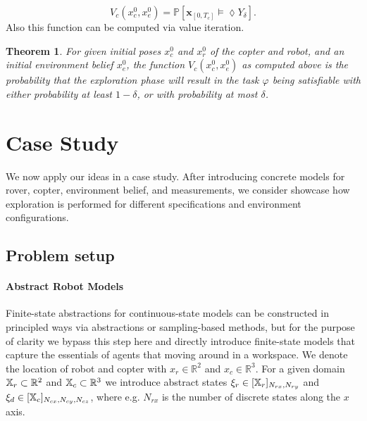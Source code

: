\documentclass[draft,conference]{IEEEtran}
\newtheorem{theorem}{Theorem}
\begin{document}

\begin{equation}
\label{eq:coptervalue}
	V_c(x^0_c, x^0_e) = \mathbb{P} \left[ \mathbf{x}_{[0, T_c]} \models \lozenge Y_\delta \right].
\end{equation}
Also this function can be computed via value iteration.

\begin{theorem}
	For given initial poses $x_c^0$ and $x_r^0$ of the copter and robot, and an initial environment belief $x_e^0$, the function $V_c(x_c^0, x_e^0)$ as computed above is the probability that the exploration phase will result in the task $\varphi$ being satisfiable with either probability at least $1- \delta$, or with probability at most $\delta$.  
\end{theorem}



\section{Case Study}
\label{sec:casestudy}

We now apply our ideas in a case study. After introducing concrete models for rover, copter, environment belief, and measurements, we consider showcase how exploration is performed for different specifications and environment configurations.

\subsection{Problem setup}

\paragraph{Abstract Robot Models}

Finite-state abstractions for continuous-state models can be constructed in principled ways via abstractions or sampling-based methods, but for the purpose of clarity we bypass this step here and directly introduce finite-state models that capture the essentials of agents that moving around in a workspace. We denote the location of robot and copter with $x_r \in \mathbb{R}^2$ and $x_c \in \mathbb{R}^3$. For a given domain $\mathbb{X}_r \subset \mathbb{R}^2$ and $\mathbb{X}_c \subset \mathbb{R}^3$ we introduce abstract states $\xi_r \in [\mathbb{X}_r]_{N_{rx}, N_{ry}}$ and $\xi_d \in [\mathbb{X}_c]_{N_{cx}, N_{cy}, N_{cz}}$, where e.g. $N_{rx}$ is the number of discrete states along the $x$ axis. 
\end{document}

